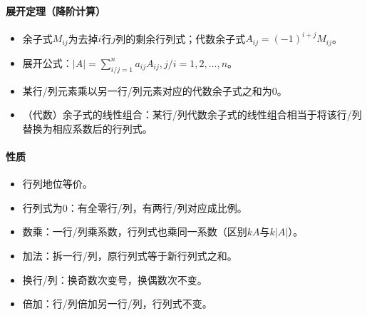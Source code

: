 \documentclass[
12pt, %
a4paper, 
oneside, %
headinclude,footinclude, %
]{scrartcl}
\begin{document}
\paragraph{展开定理（降阶计算）}
\begin{itemize}
\item 余子式$ M_{ij} $为去掉$ i $行$ j $列的剩余行列式；代数余子式$ A_{ij} = (-1)^{i+j} M_{ij} $。
\item 展开公式：$ |A| = \sum_{i/j = 1}^n a_{ij}A_{ij}, j/i = 1, 2, \dots, n $。
\item 某行/列元素乘以另一行/列元素对应的代数余子式之和为$ 0 $。
\item （代数）余子式的线性组合：某行/列代数余子式的线性组合相当于将该行/列替换为相应系数后的行列式。
\end{itemize}
\paragraph{性质}
\begin{itemize}
\item 行列地位等价。
\item 行列式为$ 0 $：有全零行/列，有两行/列对应成比例。
\item 数乘：一行/列乘系数，行列式也乘同一系数（区别$ kA $与$ k|A| $）。
\item 加法：拆一行/列，原行列式等于新行列式之和。
\item 换行/列：换奇数次变号，换偶数次不变。
\item 倍加：行/列倍加另一行/列，行列式不变。   
\end{itemize}
\end{document}
